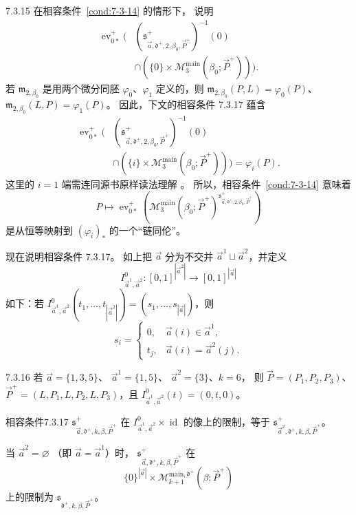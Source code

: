 \begin{remark}{7.3.15}\label{rem:7-3-15}
在相容条件~\ref{cond:7-3-14} 的情形下，
说明
\[
\begin{aligned}
\operatorname{ev}_{0*}^+\bigl(&
(\mathfrak s^+_{\vec a,\mathfrak d^+,2,
\beta_0,\vec P^+})^{-1}(0)\\
&\cap
(\{0\}\times\mathcal M^{\mathrm{main}}_3
(\beta_0;\vec P^+))\bigr).
\end{aligned}
\]
若 $\mathfrak m_{2,\beta_0}$
是用两个微分同胚 $\varphi_0$、$\varphi_1$
定义的，则
$\mathfrak m_{2,\beta_0}(P,L)=\varphi_0(P)$、
$\mathfrak m_{2,\beta_0}(L,P)=\varphi_1(P)$。
因此，下文的相容条件 7.3.17 蕴含
\[
\begin{aligned}
\operatorname{ev}_{0*}^+\bigl(&
(\mathfrak s^+_{\vec a,\mathfrak d^+,2,
\beta_0,\vec P^+})^{-1}(0)\\
&\cap
(\{i\}\times\mathcal M^{\mathrm{main}}_3
(\beta_0;\vec P^+))\bigr)
=\varphi_i(P).
\end{aligned}
\]
这里的 $i=1$ 端需连同源书原样读法理解
。
所以，相容条件~\ref{cond:7-3-14}
意味着
\[
P\longmapsto\operatorname{ev}_{0*}^+
\left(\mathcal M^{\mathrm{main}}_3
(\beta_0;\vec P^+)^{
\mathfrak s^+_{\vec a,\mathfrak d^+,2,
\beta_0,\vec P^+}}\right)
\]
是从恒等映射到
$(\varphi_i)_*$ 的一个“链同伦”。
\end{remark}

现在说明相容条件 7.3.17。
如上把 $\vec a$ 分为不交并
$\vec a^1\sqcup\vec a^2$，并定义
\[
I^0_{\vec a^1,\vec a^2}\colon
[0,1]^{|\vec a^2|}\longrightarrow
[0,1]^{|\vec a|}
\]
如下：若
$I^0_{\vec a^1,\vec a^2}
(t_1,\ldots,t_{|\vec a^2|})
=(s_1,\ldots,s_{|\vec a|})$，则
\[
s_i=
\begin{cases}
0,&\vec a(i)\in\vec a^1,\\
t_j,&\vec a(i)=\vec a^2(j).
\end{cases}
\]

\begin{example}{7.3.16}\label{ex:7-3-16}
若 $\vec a=\{1,3,5\}$、
$\vec a^1=\{1,5\}$、
$\vec a^2=\{3\}$、$k=6$，
则 $\vec P=(P_1,P_2,P_3)$、
$\vec P^+=(L,P_1,L,P_2,L,P_3)$，且
$I^0_{\vec a^1,\vec a^2}(t)=(0,t,0)$。
\end{example}

\begin{statement}{相容条件}{7.3.17}\label{cond:7-3-17}
%
$\mathfrak s^+_{\vec a,\mathfrak d^+,
k,\beta,\vec P^+}$ 在
$I^0_{\vec a^1,\vec a^2}\times\operatorname{id}$
的像上的限制，等于
$\mathfrak s^+_{\vec a^2,\mathfrak d^+,
k,\beta,\vec P^+}$。

当 $\vec a^2=\varnothing$
（即 $\vec a=\vec a^1$）时，
$\mathfrak s^+_{\vec a,\mathfrak d^+,
k,\beta,\vec P^+}$ 在
\[
\{0\}^{|\vec a|}\times
\mathcal M^{\mathrm{main},\mathfrak d^+}_{k+1}
(\beta;\vec P^+)
\]
上的限制为
$\mathfrak s_{\mathfrak d^+,k,\beta,\vec P^+}$。
\end{statement}

